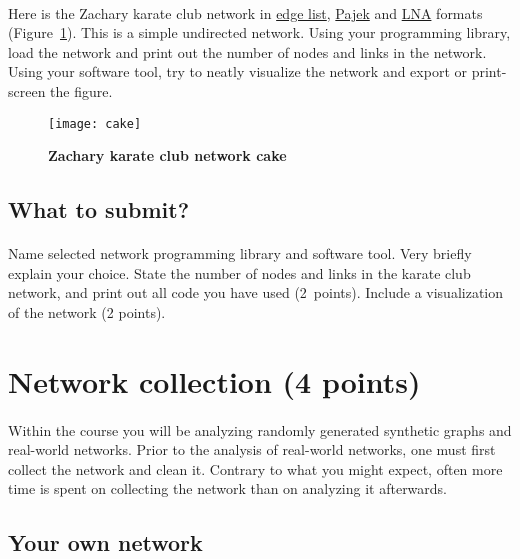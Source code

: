 \documentclass[11pt,a4paper]{article}
\newcommand{\figref}[1]{{\color{LimeGreen}Figure~\ref{fig:#1}}}
\begin{document}
\paragraph{} Here is the Zachary karate club network in \href{http://lovro.lpt.fri.uni-lj.si/ina/karate_club.adj}{edge list}, \href{http://lovro.lpt.fri.uni-lj.si/ina/karate_club.net}{Pajek} and \href{http://lovro.lpt.fri.uni-lj.si/ina/karate_club}{LNA} formats (\figref{cake}). This is a simple undirected network. Using your programming library, load the network and print out the number of nodes and links in the network. Using your software tool, try to neatly visualize the network and export or print-screen the figure.

\begin{figure}[b] \centering
	\texttt{[image: cake]}
	\caption{{\bf Zachary karate club network cake}}
	\label{fig:cake}
\end{figure}

\subsection*{What to submit?}

\paragraph{} Name selected network programming library and software tool. Very briefly explain your choice. State the number of nodes and links in the karate club network, and print out all code you have used ({\color{magenta}2~points}). Include a visualization of the network ({\color{magenta}2 points}).

\section{Network collection ({\color{magenta}4 points})}

\paragraph{} Within the course you will be analyzing randomly generated synthetic graphs and real-world networks. Prior to the analysis of real-world networks, one must first collect the network and clean it. Contrary to what you might expect, often more time is spent on collecting the network than on analyzing it afterwards.

\subsection{Your own network}
\end{document}

